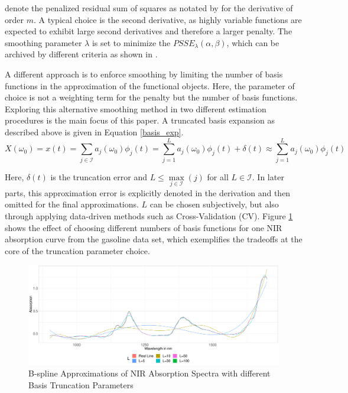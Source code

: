 \documentclass[11pt,twoside,a4paper]{article}
\begin{document}
	denote the penalized residual sum of squares as notated by \cite{ramsay_functional_2005} for the derivative of order $m$. A typical choice is the second derivative, as highly variable functions are expected to exhibit large second derivatives and therefore a larger penalty. The smoothing parameter $\lambda$ is set to minimize the $PSSE_\lambda(\alpha, \beta)$, which can be archived by different criteria as shown in \cite{ThomasLee_2003}.
	
	A different approach is to enforce smoothing by limiting the number of basis functions in the approximation of the functional objects. Here, the parameter of choice is not a weighting term for the penalty but the number of basis functions. Exploring this alternative smoothing method in two different estimation procedures is the main focus of this paper. A truncated basis expansion as described above is given in Equation \ref{basis_exp}.
	\begin{equation}\label{basis_exp}
		X(\omega_0) = x(t) = \sum_{j \in \mathcal{I}} a_j(\omega_0) \phi_j(t) = \sum_{j = 1}^{L} a_j(\omega_0) \phi_j(t) + \delta(t) \approx \sum_{j = 1}^{L} a_j(\omega_0) \phi_j(t)
	\end{equation}

	Here, $\delta(t)$ is the truncation error and $L \leq \max\limits_{j \in \mathcal{I}}(j)$ for all $L \in \mathcal{I}$.  In later parts, this approximation error is explicitly denoted in the derivation and then omitted for the final approximations. $L$ can be chosen subjectively, but also through applying data-driven methods such as Cross-Validation (CV). Figure \ref{Different_Expansions} shows the effect of choosing different numbers of basis functions for one NIR absorption curve from the gasoline data set, which exemplifies the tradeoffs at the core of the truncation parameter choice.
			
	\begin{figure}[H]
		\includegraphics[width=\textwidth]{../Graphics/basis_expansions.pdf}
		\caption{B-spline Approximations of NIR Absorption Spectra with different Basis Truncation Parameters}
		\label{Different_Expansions}
	\end{figure}
	
\end{document}
